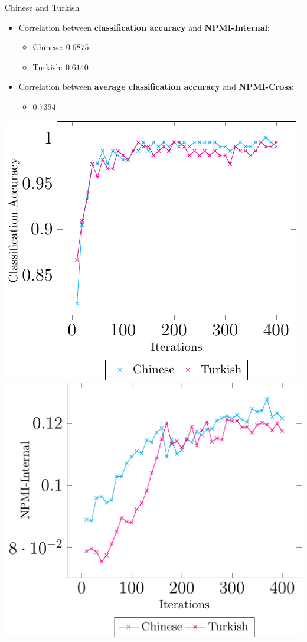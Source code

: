 \documentclass[compress]{beamer}
\begin{document}
	\begin{frame}{Chinese and Turkish}
		\begin{itemize}
			\item Correlation between \textbf{classification accuracy} and \textbf{NPMI-Internal}:
				\begin{itemize}
					\item Chinese: $0.6875$
					\item Turkish: $0.6140$
				\end{itemize}
			\item Correlation between \textbf{average classification accuracy} and \textbf{NPMI-Cross}:
				\begin{itemize}
					\item $0.7394$
				\end{itemize}
		\end{itemize}
		\begin{center}
			\includegraphics[height=0.5\textheight]{multilingual_itm/clf-cmn-tr.pdf}
			\includegraphics[height=0.5\textheight]{multilingual_itm/npmi-cmn-tr.pdf}
		\end{center}
	\end{frame}
\end{document}
